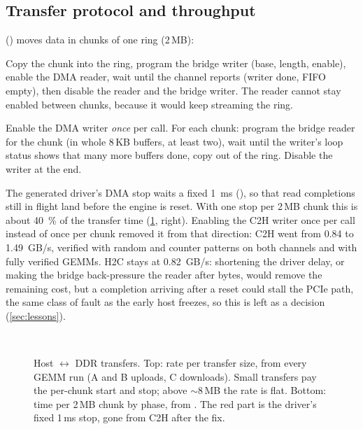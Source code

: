 \subsection{Transfer protocol and throughput}
\label{sec:pcie:rates}
 () moves data in chunks of one ring (2\,MB):
\begin{description}[font=\sffamily\small, leftmargin=1.2em]
  \item[H2C] Copy the chunk into the ring, program the bridge writer (base, length, enable), enable the DMA reader,
        wait until the channel reports  (writer done, FIFO empty), then disable the reader and the
        bridge writer. The reader cannot stay enabled between chunks, because it would keep streaming the ring.
  \item[C2H] Enable the DMA writer \emph{once} per call. For each chunk: program the bridge reader for the chunk (in
        whole 8\,KB buffers, at least two), wait until the writer's loop status shows that many more buffers done,
        copy out of the ring. Disable the writer at the end.
\end{description}

The generated driver's DMA stop waits a fixed \SI{1}{ms} (), so that read completions still in
flight land before the engine is reset. With one stop per 2\,MB chunk this is about \SI{40}{\percent} of the transfer
time (\cref{fig:dma}, right). Enabling the C2H writer once per call instead of once per chunk removed it from that
direction: C2H went from 0.84 to \SI{1.49}{GB/s}, verified with random and counter patterns on both channels and
with fully verified GEMMs. H2C stays at \SI{0.82}{GB/s}: shortening the driver delay, or making the bridge
back-pressure the reader after  bytes, would remove the remaining cost, but a completion arriving after a
reset could stall the PCIe path, the same class of fault as the early host freezes, so this is left as a decision
(\cref{sec:lessons}).

\begin{figure}[t]
  \centering
  \\[2mm]
  
  \caption{Host \(\leftrightarrow\) DDR transfers. Top: rate per transfer size, from every GEMM run (A and B
    uploads, C downloads). Small transfers pay the per-chunk start and stop; above \(\sim\)8\,MB the rate is flat.
    Bottom: time per 2\,MB chunk by phase, from . The red part is the driver's fixed 1\,ms stop,
    gone from C2H after the fix.}
  \label{fig:dma}
\end{figure}
